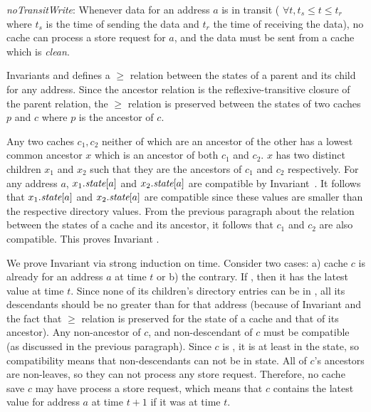 \begin{inv}
\textit{noTransitWrite}: Whenever data for an address $a$ is in transit (\ie{}
$\forall t, t_s \le t \le t_r$ where $t_s$ is the time of sending the data and
$t_r$ the time of receiving the data), no cache can process a store request for
$a$, and the data must be sent from a cache which is \textit{clean}.
\label{noTransitWrite}
\end{inv}

Invariants  and  defines a
$\ge$ relation between the states of a parent and its child for any address.
Since the ancestor relation is the reflexive-transitive closure of the parent
relation, the $\ge$ relation is preserved between the states of two caches $p$
and $c$ where $p$ is the ancestor of $c$.

Any two caches $c_1, c_2$ neither of which are an ancestor of the other has a
lowest common ancestor $x$ which is an ancestor of both $c_1$ and $c_2$. $x$
has two distinct children $x_1$ and $x_2$ such that they are the ancestors of
$c_1$ and $c_2$ respectively. For any address $a$, $x_1.\textit{state}[a]$ and
$x_2.\textit{state}[a]$ are compatible by 
Invariant~. It follows that $x_1.\textit{state}[a]$ and
$x_2.\textit{state}[a]$ are compatible since these values are smaller than the
respective directory values. From the previous paragraph about the relation
between the states of a cache and its ancestor, it follows that $c_1$ and $c_2$
are also compatible. This proves Invariant .

We prove Invariant  via strong induction on time. Consider
two cases: a) cache $c$ is already \clean{} for an address $a$ at time $t$ or
b) the contrary.  If \clean{}, then it has the latest value at time $t$. Since
none of its children's directory entries can be in \Mo{}, all its descendants
should be no greater than \Sh{} for that address (because of Invariant
 and the fact that $\ge$ relation is preserved for the
state of a cache and that of its ancestor). Any non-ancestor of $c$, and
non-descendant of $c$ must be compatible (as discussed in the previous
paragraph).  Since $c$ is \clean, it is at least in the \Sh{} state, so
compatibility means that non-descendants can not be in \Mo{} state. All of
$c$'s ancestors are non-leaves, so they can not process any store request.
Therefore, no cache save $c$ may have process a store request, which means that
$c$ contains the latest value for address $a$ at time $t+1$ if it was \clean{}
at time $t$.

